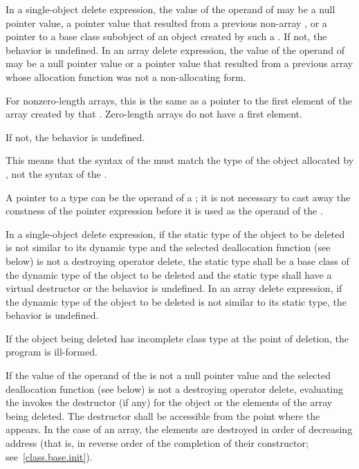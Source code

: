 \pnum
{}%
In a single-object delete expression, the value of the operand of
 may be a null pointer value,
a pointer value
that resulted from a previous non-array , or
a pointer to a base class subobject
of an object created by such a .
If not, the behavior is undefined.
%
In an array delete expression, the value of the operand of 
may be a null pointer value or a pointer value that resulted from
a previous array  whose
allocation function was not a non-allocating form.
\begin{footnote}
For nonzero-length
arrays, this is the same as a pointer to the first
element of the array created by that .
Zero-length arrays do not have a first element.
\end{footnote}
If not, the behavior is undefined.
\begin{note}
This means that the syntax of the  must
match the type of the object allocated by , not the syntax of the
.
\end{note}
\begin{note}
A pointer to a  type can be the operand of a
; it is not necessary to cast away the
constness of the pointer expression before it is
used as the operand of the .
\end{note}

\pnum
{}%
In a single-object delete expression, if the static type of the object to be
deleted is not similar to its dynamic type
and the selected deallocation function (see below)
is not a destroying operator delete,
the static type shall be a base
class of the dynamic type of the object to be deleted and the static type shall
have a virtual destructor or the behavior is undefined. In an array delete
expression, if the dynamic type of the object to be deleted is not similar to
its static type, the behavior is undefined.

\pnum
{}%
If the object being deleted has incomplete class type at the point of deletion,
the program is ill-formed.

\pnum
{}%
If the value of the operand of the  is not a
null pointer value
and the selected deallocation function (see below)
is not a destroying operator delete,
evaluating the  invokes the
destructor (if any) for the object or the elements of the array being
deleted.
The destructor shall be accessible from the point where
the  appears.
In the case of an array, the elements are destroyed in
order of decreasing address (that is, in reverse order of the completion
of their constructor; see~\ref{class.base.init}).

